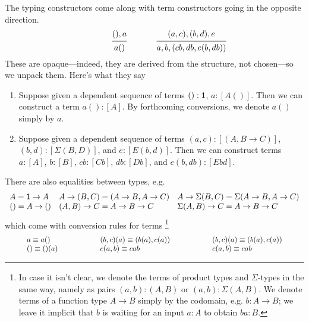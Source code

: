\documentclass[11pt, one side, article]{memoir}
\theoremstyle{definition}
\theoremstyle{plain}
\newcommand{\0}{\textsf{0}}
\newcommand{\1}{\tn{\textsf{1}}}
\begin{document}
The typing constructors come along with term constructors going in the opposite direction. 
\begin{equation}\label{eqn.premise_axiom}
	\hspace{.5in}
  \begin{prooftree}
    \Hypo{(),a}
    \Infer1{a()}
  \end{prooftree}
\hspace{.5in}
  \begin{prooftree}
    \Hypo{(a,c), (b,d), e}
    \Infer1{a,b,(cb, db ,e(b, db))}
  \end{prooftree}
\end{equation}
These are opaque---indeed, they are derived from the structure, not chosen---so we unpack them. Here's what they say
\begin{enumerate}[label=(\roman*)]
	\item Suppose given a dependent sequence of terms $():\1$, $a:[A()]$. Then we can construct a term $a():[A]$. By forthcoming conversions, we denote $a()$ simply by $a$.
	\item Suppose given a dependent sequence of terms $(a,c):[(A,B\to C)]$, $(b,d):[\Sigma(B,D)]$, and $e:[E(b,d)]$. Then we can construct terms $a:[A]$, $b:[B]$, $cb:[Cb]$, $db:[Db]$, and $e(b,db):[E b d]$.
\end{enumerate}
There are also equalities between types, e.g.
\[
\begin{array}{lll}
	A=\1\to A&
		A\to(B,C)=(A\to B,A\to C)&
			A\to\Sigma(B,C)=\Sigma(A\to B,A\to C)\\
	()=A\to ()&
		(A,B)\to C=A\to B\to C&
			\Sigma(A,B)\to C=A\to B\to C
\end{array}
\]
which come with conversion rules for terms%
\footnote{In case it isn't clear, we denote the terms of product types and $\Sigma$-types in the same way, namely as pairs $(a,b):(A,B)$ or $(a,b):\Sigma(A,B)$. We denote terms of a function type $A\to B$ simply by the codomain, e.g. $b:A\to B$; we leave it implicit that $b$ is waiting for an input $a:A$ to obtain $ba:B$.}
\[\arraycolsep=1cm
\begin{array}{lll}
	a\equiv a()&
		(b,c)(a)\equiv (b(a),c(a))&
			(b,c)(a)\equiv (b(a),c(a))\\
	()\equiv()(a)&
		c(a,b)\equiv c a b&
			c(a,b)\equiv c a b
\end{array}
\]
\end{document}
